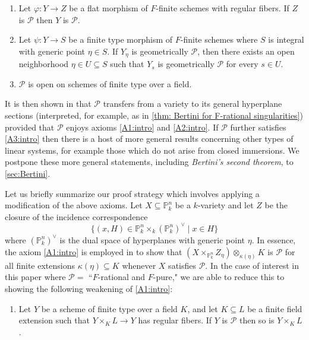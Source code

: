 \documentclass[reqno,11pt]{amsart}
\numberwithin{equation}{section}
\theoremstyle{definition}
\theoremstyle{definition}
\theoremstyle{definition}
\theoremstyle{remark}
\newcommand{\PP}{\mathbb{P}}
\newcommand{\cP}{\mathcal{P}}
\begin{document}
\begin{enumerate}[label=(A\arabic*)]
    \item Let $\varphi\colon Y\to Z$ be a flat morphism of $F$-finite schemes with regular fibers. If $Z$ is $\cP$ then $Y$ is $\cP$.\label{A1:intro}
    \item Let $\psi\colon Y\to S$ be a finite type morphism of $F$-finite schemes where $S$ is integral with generic point $\eta\in S$. If $Y_\eta$ is geometrically $\cP$, then there exists an open neighborhood $\eta\in U\subseteq S$ such that $Y_s$ is geometrically $\cP$ for every $s\in U$.\label{A2:intro}
    \item $\cP$ is open on schemes of finite type over a field.\label{A3:intro}
\end{enumerate}
It is then shown in \cite[Theorem 1]{CGM86} that $\cP$ transfers from a variety to its general hyperplane sections (interpreted, for example, as in \cref{thm: Bertini for F-rational singularities}) provided that $\cP$ enjoys axioms \ref{A1:intro} and \ref{A2:intro}. If $\cP$ further satisfies \ref{A3:intro} then there is a host of more general results concerning other types of linear systems, for example those which do not arise from closed immersions. We postpone these more general statements, including \emph{Bertini's second theorem}, to \cref{sec:Bertini}.

Let us briefly summarize our proof strategy which involves applying a modification of the above axioms. Let $X\subseteq\PP^n_k$ be a $k$-variety and let $Z$ be the closure of the incidence correspondence $$\{(x,H)\in \PP^n_k\times_k (\PP^n_k)^{\vee}\mid x\in H\}$$ where $(\PP^n_k)^{\vee}$ is the dual space of hyperplanes with generic point $\eta$. In essence, the axiom \ref{A1:intro} is employed in \cite{CGM86} to show that $(X\times_{\PP^n_k} Z_\eta)\otimes_{\kappa(\eta)} K$ is $\cP$ for all finite extensions $\kappa(\eta)\subseteq K$ whenever $X$ satisfies $\cP$. In the case of interest in this paper where $\cP= $ ``$F$-rational and $F$-pure," we are able to reduce this to showing the following weakening of \ref{A1:intro}:

\begin{enumerate}[label=(B\arabic*)]
    \item Let $Y$ be a scheme of finite type over a field $K$, and let $K \subseteq L$ be a finite field extension such that $Y \times_K L \to Y$ has regular fibers. If $Y$ is $\cP$ then  so is $Y \times_K L$. \label{CGM-B1-intro}
\end{enumerate}
\end{document}
